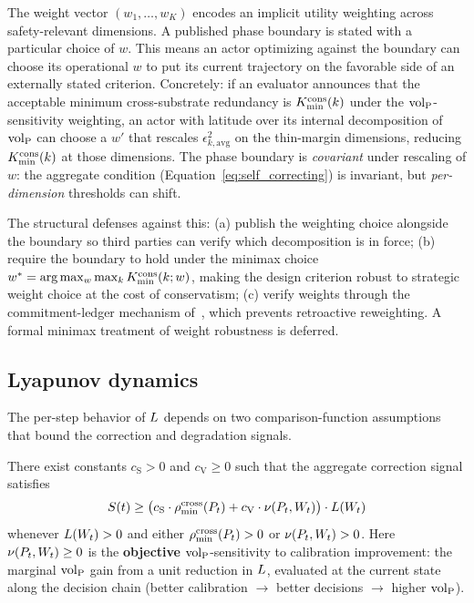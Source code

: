\begin{remark}
\label{rem:weights_attack}
The weight vector $(w_1, \ldots, w_K)$ encodes an implicit utility
weighting across safety-relevant dimensions.  A published phase
boundary is stated with a particular choice of $w$.  This means an
actor optimizing against the boundary can choose its operational $w$
to put its current trajectory on the favorable side of an externally
stated criterion.  Concretely: if an evaluator announces that the
acceptable minimum cross-substrate redundancy is
$K_{\mathrm{min}}^{\mathrm{cons}}(k)$ under the ${\operatorname{vol}_{\mathrm{P}}}$-sensitivity weighting, an actor with
latitude over its internal decomposition of ${\operatorname{vol}_{\mathrm{P}}}$ can choose a $w'$
that rescales $\epsilon_{k,\mathrm{avg}}^2$ on the thin-margin
dimensions, reducing $K_{\mathrm{min}}^{\mathrm{cons}}(k)$ at those dimensions.  The phase
boundary is \emph{covariant} under rescaling of $w$: the aggregate
condition (Equation~\ref{eq:self_correcting}) is invariant, but
\emph{per-dimension} thresholds can shift.

The structural defenses against this: (a) publish the weighting
choice alongside the boundary so third parties can verify which
decomposition is in force; (b) require the boundary to hold under
the minimax choice $w^* = \arg\max_w \max_k K_{\mathrm{min}}^{\mathrm{cons}}(k; w)$,
making the design criterion robust to strategic weight choice at the
cost of conservatism; (c) verify weights through the
commitment-ledger mechanism of~\citet{lasser2026exo}, which prevents
retroactive reweighting.  A formal minimax treatment of weight
robustness is deferred.
\end{remark}

\subsection{Lyapunov dynamics}

The per-step behavior of $L$ depends on two comparison-function
assumptions that bound the correction and degradation signals.

\begin{assumption}
\label{ass:C1}
There exist constants $c_{\mathrm{S}} > 0$ and $c_{\mathrm{V}} \geq 0$
such that the aggregate correction signal satisfies
\begin{equation}
\label{eq:C1}
S(t) \geq \bigl(c_{\mathrm{S}} \cdot \rho_{\min}^{\mathrm{cross}}(P_t)
  + c_{\mathrm{V}} \cdot \nu(P_t, W_t)\bigr) \cdot L(W_t)
\end{equation}
whenever $L(W_t) > 0$ and either $\rho_{\min}^{\mathrm{cross}}(P_t) > 0$ or
$\nu(P_t, W_t) > 0$.  Here $\nu(P_t, W_t) \geq 0$ is the
\textbf{objective} ${\operatorname{vol}_{\mathrm{P}}}$-sensitivity to calibration improvement:
the marginal ${\operatorname{vol}_{\mathrm{P}}}$ gain from a unit reduction in $L$, evaluated
at the current state along the decision chain (better calibration
$\to$ better decisions $\to$ higher ${\operatorname{vol}_{\mathrm{P}}}$).
\end{assumption}

